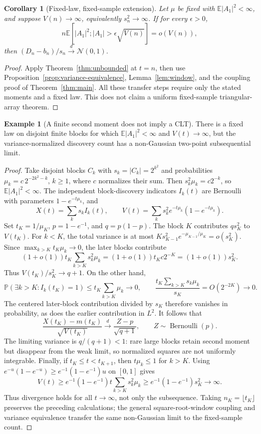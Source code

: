 \documentclass[11pt]{article}
\numberwithin{equation}{section}
\newtheorem{corollary}[theorem]{Corollary}
\theoremstyle{definition}
\newtheorem{example}[theorem]{Example}
\theoremstyle{remark}
\newcommand{\E}{\mathbb E}
\newcommand{\Pp}{\mathbb P}
\newcommand{\Normal}{\mathcal N(0,1)}
\newcommand{\dto}{\xrightarrow{\ d\ }}
\begin{document}
\begin{corollary}[Fixed-law, fixed-sample extension]\label{cor:unboundedfixed}
Let $\mu$ be fixed with $\E|A_1|^2<\infty$, and suppose $V(n)\to\infty$,
equivalently $s_n^2\to\infty$. If for every $\epsilon>0$,
\[
 n\E[|A_1|^2;|A_1|>\epsilon\sqrt{V(n)}]=o(V(n)),
\]
then $(D_n-b_n)/s_n\dto\Normal$.
\end{corollary}
\begin{proof}
Apply Theorem~\ref{thm:unbounded} at $t=n$, then use
Proposition~\ref{prop:variance-equivalence}, Lemma~\ref{lem:window}, and the
coupling proof of Theorem~\ref{thm:main}. All these transfer steps require
only the stated moments and a fixed law. This does not claim a uniform
fixed-sample triangular-array theorem.
\end{proof}

\begin{example}[A finite second moment does not imply a CLT]\label{ex:unbounded}
There is a fixed law on disjoint finite blocks for which $\E|A_1|^2<\infty$
and $V(t)\to\infty$, but the variance-normalized discovery count has a
non-Gaussian two-point subsequential limit.
\end{example}
\begin{proof}
Take disjoint blocks $C_k$ with $s_k=|C_k|=2^{k^2}$ and probabilities
$\mu_k=c\,2^{-2k^2-k}$, $k\ge1$, where $c$ normalizes their sum.
Then $s_k^2\mu_k=c2^{-k}$, so $\E|A_1|^2<\infty$.
The independent block-discovery indicators $I_k(t)$ are Bernoulli with
parameters $1-e^{-t\mu_k}$, and
\[
 X(t)=\sum_k s_k I_k(t),\qquad
 V(t)=\sum_k s_k^2 e^{-t\mu_k}(1-e^{-t\mu_k}).
\]
Set $t_K=1/\mu_K$, $p=1-e^{-1}$, and $q=p(1-p)$.
The block $K$ contributes $q s_K^2$ to $V(t_K)$. For $k<K$, the total
variance is at most $K s_{K-1}^2e^{-\mu_{K-1}/\mu_K}=o(s_K^2)$.
Since $\max_{k>K}t_K\mu_k\to0$, the later blocks contribute
\[
 (1+o(1))t_K\sum_{k>K}s_k^2\mu_k
 =(1+o(1))t_Kc2^{-K}=(1+o(1))s_K^2.
\]
Thus $V(t_K)/s_K^2\to q+1$. On the other hand,
\[
 \Pp(\exists k>K:I_k(t_K)=1)\le t_K\sum_{k>K}\mu_k\to0,
 \qquad
 \frac{t_K\sum_{k>K}s_k\mu_k}{s_K}=O(2^{-2K})\to0.
\]
The centered later-block contribution divided by $s_K$ therefore vanishes
in probability, as does the earlier contribution in $L^2$. It follows that
\begin{equation}\label{eq:twopoint}
 \frac{X(t_K)-m(t_K)}{\sqrt{V(t_K)}}
 \dto \frac{Z-p}{\sqrt{q+1}},\qquad Z\sim\operatorname{Bernoulli}(p).
\end{equation}
The limiting variance is $q/(q+1)<1$: rare large blocks retain second moment
but disappear from the weak limit, so normalized squares are not uniformly
integrable. Finally, if $t_K\le t<t_{K+1}$, then $t\mu_k\le1$ for $k>K$.
Using $e^{-u}(1-e^{-u})\ge e^{-1}(1-e^{-1})u$ on $[0,1]$ gives
\[
 V(t)\ge e^{-1}(1-e^{-1})t\sum_{k>K}s_k^2\mu_k
 \ge e^{-1}(1-e^{-1})s_K^2\to\infty.
\]
Thus divergence holds for all $t\to\infty$, not only the subsequence.
Taking $n_K=\lfloor t_K\rfloor$ preserves the preceding calculations;
the general square-root-window coupling and variance equivalence transfer
the same non-Gaussian limit to the fixed-sample count.
\end{proof}
\end{document}
